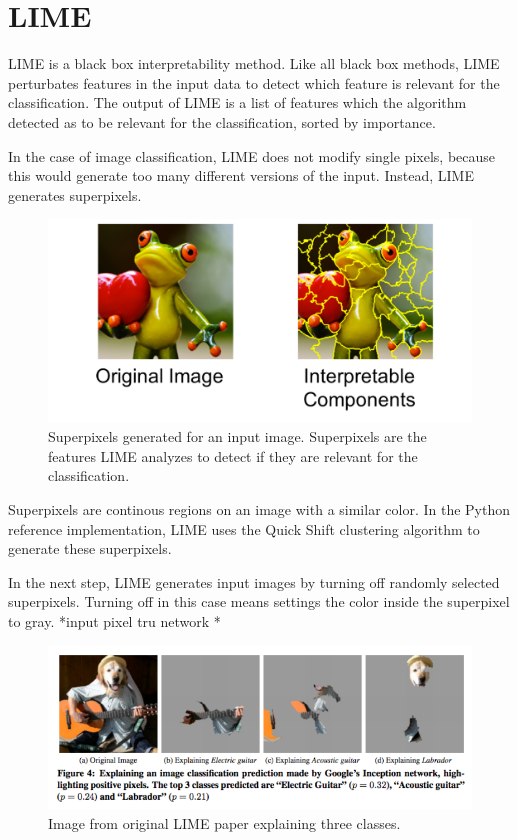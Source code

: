 \section{LIME}

LIME \cite{ribeiro2016should} is a black box interpretability method. Like all black box methods, LIME perturbates features in the input data to detect which feature is relevant for the classification. The output of LIME is a list of features which the algorithm detected as to be relevant for the classification, sorted by importance.

In the case of image classification, LIME does not modify single pixels, because this would generate too many different versions of the input.
Instead, LIME generates superpixels.

\begin{figure}[H]
\centering
\includegraphics[width=14cm]{chapters/02_methods/images/lime.jpg}
\caption{Superpixels generated for an input image. Superpixels are the features LIME analyzes to detect if they are relevant for the classification.}
\end{figure}

Superpixels are continous regions on an image with a similar color. In the Python reference implementation, LIME uses the Quick Shift \cite{vedaldi2008quick} clustering algorithm to generate these superpixels.

In the next step, LIME generates input images by turning off randomly selected superpixels. Turning off in this case means settings the color inside the superpixel to gray.
*input pixel tru network
*



\begin{figure}[H]
\centering
\includegraphics[width=14cm]{chapters/02_methods/images/lime.png}
\caption{Image from original LIME paper explaining three classes.}
\end{figure}
